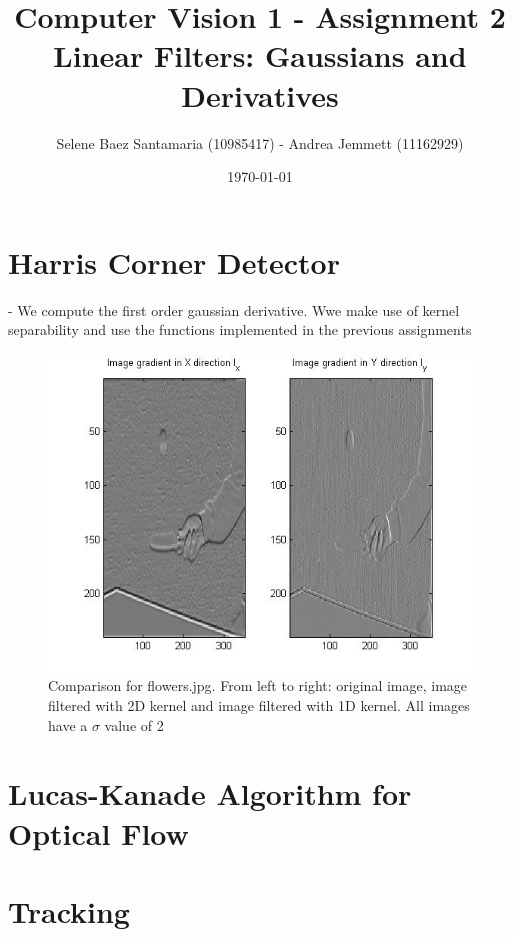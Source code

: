 \documentclass[11pt]{article}
\title{
	{Computer Vision 1 - Assignment 2 \\
	Linear Filters: Gaussians and Derivatives}
}
\author{
Selene Baez Santamaria (10985417) - Andrea Jemmett (11162929)}
\date{\today}
\begin{document}
\maketitle

\section{Harris Corner Detector}
- We compute the first order gaussian derivative. Wwe make use of kernel separability and use the functions implemented in the previous assignments

\begin{figure}[H] \centering
	\includegraphics[width=1\textwidth]{imgs/derivatives_pingpong.jpg}
	\caption{Comparison for flowers.jpg. From left to right: original image, image
		filtered with 2D kernel and image filtered with 1D kernel. All images have a
		$\sigma$ value of 2}
	\label{fig:partialDerivatives_person}
\end{figure}



\section{Lucas-Kanade Algorithm for Optical Flow}



\section{Tracking}
\end{document}
